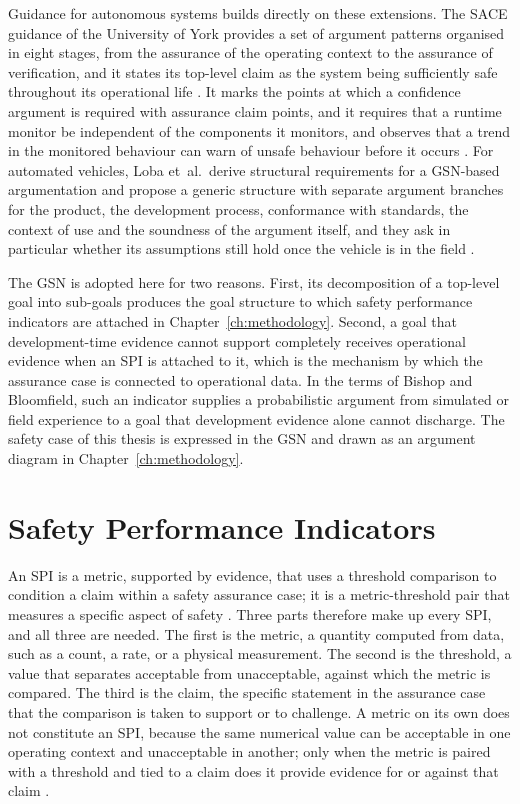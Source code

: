 Guidance for autonomous systems builds directly on these extensions. The \ac{SACE}
guidance of the University of York provides a set of argument patterns organised in
eight stages, from the assurance of the operating context to the assurance of
verification, and it states its top-level claim as the system being sufficiently safe
throughout its operational life \cite{hawkins2022sace}. It marks the points at which a
confidence argument is required with assurance claim points, and it requires that a
runtime monitor be independent of the components it monitors, and observes that a trend
in the monitored behaviour can warn of unsafe behaviour before it occurs
\cite{hawkins2022sace}. For automated vehicles, Loba et~al.\ derive structural
requirements for a \ac{GSN}-based argumentation and propose a generic structure with
separate argument branches for the product, the development process, conformance with
standards, the context of use and the soundness of the argument itself, and they ask
in particular whether its assumptions still hold once the vehicle is in the field
\cite{loba2025harmonized}.

The \ac{GSN} is adopted here for two reasons. First, its decomposition of a top-level
goal into sub-goals produces the goal structure to which safety performance indicators
are attached in Chapter~\ref{ch:methodology}. Second, a goal that development-time evidence cannot support completely receives
operational evidence when an \ac{SPI} is attached to it, which is the mechanism by which
the assurance case is connected to operational data.
In the terms of Bishop and Bloomfield, such an indicator supplies a probabilistic
argument from simulated or field experience to a goal that development evidence alone
cannot discharge. The safety case of this thesis is expressed in the \ac{GSN} and
drawn as an argument diagram in Chapter~\ref{ch:methodology}.

\section{Safety Performance Indicators}
\label{sec:fund_spi}

An \ac{SPI} is a metric, supported by evidence, that uses a threshold comparison to
condition a claim within a safety assurance case; it is a metric-threshold pair that
measures a specific aspect of safety \cite{laxman2024}. Three parts therefore make up
every \ac{SPI}, and all three are needed. The first is the metric, a quantity computed
from data, such as a count, a rate, or a physical measurement. The second is the
threshold, a value that separates acceptable from unacceptable, against which the metric
is compared. The third is the claim, the specific statement in the assurance case that
the comparison is taken to support or to challenge. A metric on its own does not
constitute an \ac{SPI}, because the same numerical value can be acceptable in one
operating context and unacceptable in another; only when the metric is paired with a
threshold and tied to a claim does it provide evidence for or against that claim
\cite{laxman2024, koopman2022howsafe}.

